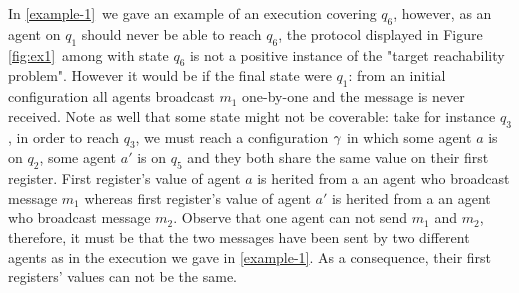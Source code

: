 \begin{example}\label{example-2}
	In \cref{example-1}~we gave an example of an execution covering $q_6$, however, as an agent on $q_1$ should never be able to reach $q_6$, the protocol displayed in Figure \ref{fig:ex1}~among with state $q_6$ is not a positive instance of the "target reachability problem". However it would be if the final state were $q_1$: from an initial configuration all agents broadcast $m_1$ one-by-one and the message is never received. Note as well that some state might not be coverable: take for instance $q_3$, in order to reach $q_3$, we must reach a configuration $\gamma$ in which some agent $a$ is on $q_2$, some agent $a'$ is on $q_5$ and they both share the same value on their first register. First register's value of agent $a$ is herited from a an agent who broadcast message $m_1$ whereas first register's value of agent $a'$ is herited from a an agent who broadcast message $m_2$. Observe that one agent can not send $m_1$ and $m_2$, therefore, it must be that the two messages have been sent by two different agents as in the execution we gave in \cref{example-1}. As a consequence, their first registers' values can not be the same.
\end{example}

